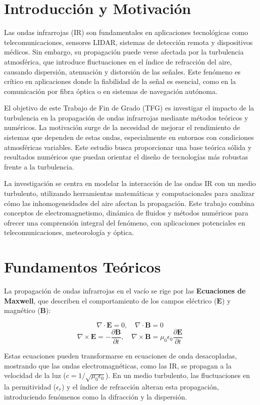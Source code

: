 \section{Introducción y Motivación}

Las ondas infrarrojas (IR) son fundamentales en aplicaciones tecnológicas como telecomunicaciones, sensores LIDAR, sistemas de detección remota y dispositivos médicos. Sin embargo, su propagación puede verse afectada por la turbulencia atmosférica, que introduce fluctuaciones en el índice de refracción del aire, causando dispersión, atenuación y distorsión de las señales. Este fenómeno es crítico en aplicaciones donde la fiabilidad de la señal es esencial, como en la comunicación por fibra óptica o en sistemas de navegación autónoma. 

El objetivo de este Trabajo de Fin de Grado (TFG) es investigar el impacto de la turbulencia en la propagación de ondas infrarrojas mediante métodos teóricos y numéricos. La motivación surge de la necesidad de mejorar el rendimiento de sistemas que dependen de estas ondas, especialmente en entornos con condiciones atmosféricas variables. Este estudio busca proporcionar una base teórica sólida y resultados numéricos que puedan orientar el diseño de tecnologías más robustas frente a la turbulencia.

La investigación se centra en modelar la interacción de las ondas IR con un medio turbulento, utilizando herramientas matemáticas y computacionales para analizar cómo las inhomogeneidades del aire afectan la propagación. Este trabajo combina conceptos de electromagnetismo, dinámica de fluidos y métodos numéricos para ofrecer una comprensión integral del fenómeno, con aplicaciones potenciales en telecomunicaciones, meteorología y óptica.

\section{Fundamentos Teóricos}

La propagación de ondas infrarrojas en el vacío se rige por las \textbf{Ecuaciones de Maxwell}, que describen el comportamiento de los campos eléctrico (\(\mathbf{E}\)) y magnético (\(\mathbf{B}\)):

\[
\nabla \cdot \mathbf{E} = 0, \quad \nabla \cdot \mathbf{B} = 0
\]
\[
\nabla \times \mathbf{E} = -\frac{\partial \mathbf{B}}{\partial t}, \quad \nabla \times \mathbf{B} = \mu_0 \epsilon_0 \frac{\partial \mathbf{E}}{\partial t}
\]

Estas ecuaciones pueden transformarse en ecuaciones de onda desacopladas, mostrando que las ondas electromagnéticas, como las IR, se propagan a la velocidad de la luz (\(c = 1/\sqrt{\mu_0 \epsilon_0}\)). En un medio turbulento, las fluctuaciones en la permitividad (\(\epsilon_r\)) y el índice de refracción alteran esta propagación, introduciendo fenómenos como la difracción y la dispersión.

